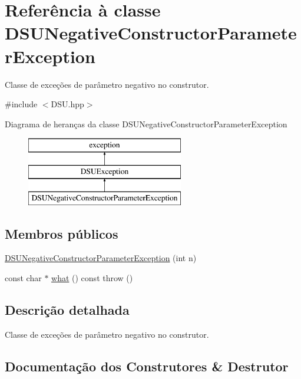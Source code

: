 \hypertarget{classDSUNegativeConstructorParameterException}{}\section{Referência à classe D\+S\+U\+Negative\+Constructor\+Parameter\+Exception}
\label{classDSUNegativeConstructorParameterException}


Classe de exceções de parâmetro negativo no construtor.  




{\ttfamily \#include $<$D\+S\+U.\+hpp$>$}

Diagrama de heranças da classe D\+S\+U\+Negative\+Constructor\+Parameter\+Exception\begin{figure}[H]
\begin{center}
\leavevmode
\includegraphics[height=3.000000cm]{classDSUNegativeConstructorParameterException}
\end{center}
\end{figure}
\subsection*{Membros públicos}
\begin{DoxyCompactItemize}
\item 
\mbox{\hyperlink{classDSUNegativeConstructorParameterException_a4d71581d8012d2d39ded7b6e240bc7e5}{D\+S\+U\+Negative\+Constructor\+Parameter\+Exception}} (int n)
\item 
const char $\ast$ \mbox{\hyperlink{classDSUNegativeConstructorParameterException_a16a3dcf8c0aeca0c1158ee18dd2a0c0f}{what}} () const  throw ()
\end{DoxyCompactItemize}


\subsection{Descrição detalhada}
Classe de exceções de parâmetro negativo no construtor. 

\subsection{Documentação dos Construtores \& Destrutor}
\mbox{\label{classDSUNegativeConstructorParameterException_a4d71581d8012d2d39ded7b6e240bc7e5}} 
